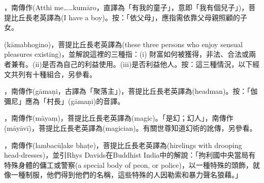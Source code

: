 \startitemgroup[noteitems]
\item{}，南傳作(Atthi me……kumāro，直譯為「有我的童子」，意即「我有個兒子」)，菩提比丘長老英譯為(I have a boy)。按：「依父母」，應指需依靠父母親照顧的子女。
\stopitemgroup

\startitemgroup[noteitems]
\item{}(kāmabhogino)，菩提比丘長老英譯為(these three persons who enjoy sensual pleasures existing)，並解說這裡的三種指：(i) 財富如何被獲得，非法、合法或兩者兼有。(ii)是否為自己的利益使用。(iii)是否利益他人。按：這三種情況，以下經文共列有十種組合，另參看。
\stopitemgroup

\startitemgroup[noteitems]
\item{}，南傳作(gāmaṇi，古譯為「聚落主」)，菩提比丘長老英譯為(headman)。按：「伽彌尼」應為「村長」(gāmaṇi)的音譯。
\stopitemgroup

\startitemgroup[noteitems]
\item{}，南傳作(māyaṃ)，菩提比丘長老英譯為(magic)。「是幻；幻人」，南傳作(māyāvī)，菩提比丘長老英譯為(magician)。有關世尊知道幻術的訛傳，另參看。
\stopitemgroup

\startitemgroup[noteitems]
\item{}，南傳作(lambacūḷake bhaṭe)，菩提比丘長老英譯為(hirelings with drooping head-dresses)，並引Rhys Davids在Buddhist India中的解說：「拘利國中央當局有特殊身體的傭工或警察(a special body of peon, or police)，以一種特殊的頭飾，就像一種制服，他們得到他們的名稱，這些特殊的人因勒索和暴力聲名狼藉。」
\stopitemgroup

